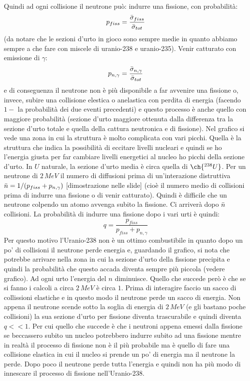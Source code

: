 Quindi ad ogni collisione il neutrone può: indurre una fissione, con probabilità:
\begin{equation*}
    p_{fiss}=\frac{\Bar{\sigma}_{fiss}}{\Bar{\sigma}_{tot}}
\end{equation*}
(da notare che le sezioni d'urto in gioco sono sempre medie in quanto abbiamo sempre a che fare con miscele di uranio-238 e uranio-235). Venir catturato con emissione di $\gamma$:
\begin{equation*}
    p_{n,\gamma}=\frac{\Bar{\sigma}_{n,\gamma}}{\Bar{\sigma}_{tot}}
\end{equation*}
e di conseguenza il neutrone non è più disponibile a far avvenire una fissione o, invece, subire una collisione elestica o anelastica con perdita di energia (facendo $1-$ la probabilità dei due eventi precedenti) e questo processo è anche quello con maggiore probabilità (sezione d'urto maggiore ottenuta dalla differenza tra la sezione d'urto totale e quella della cattura neutronica e di fissione). Nel grafico si vede una zona in cui la struttura è molto complicata con vari picchi. Quella è la struttura che indica la possibilità di eccitare livelli nucleari e quindi se ho l'energia giusta per far cambiare livelli energetici al nucleo ho picchi della sezione d'urto. In $U$ naturale, la sezione d'urto media è circa quella di $\ch{^{238}U}$. Per un neutrone di $2\,MeV$ il numero di diffusioni prima di un'interazione distruttiva $\Bar{n}=1/(p_{fiss}+ p_{n,\gamma})$ [dimostrazione nelle slide] (cioè il numero medio di collisioni prima di indurre una fissione o di venir catturato). Quindi è difficile che un neutrone colpendo un atomo avvenga subito la fissione. Ci arriverà dopo $\Bar{n}$ collisioni. La probabilità di indurre una fissione dopo i vari urti è quindi:
\begin{equation*}
    q=\frac{p_{fiss}}{p_{fiss}+p_{n,\gamma}}
\end{equation*}
Per questo motivo l'Uranio-238 non è un ottimo combustibile in quanto dopo un po' di collisioni il neutrone perde energia e, guardando il grafico, si nota che potrebbe arrivare nella zona in cui la sezione d'urto della fissione precipita e quindi la probabilità che questo accada diventa sempre più piccola (vedere grafico). Ad ogni urto l'energia del $n$ diminuisce. Quello che succede però è che se si fanno i calcoli a circa $2\,MeV$ è circa $1$. Prima di interagire faccio un sacco di collissioni elastiche e in questo modo il neutrone perde un sacco di energia. Non appena il neutrone scende sotto la soglia di energia di $2\,MeV$ (e gli bastano poche collisioni) la sua sezione d'urto per fissione diventa trascurabile e quindi diventa $q<<1$. Per cui quello che succede è che i neutroni appena emessi dalla fissione se beccassero subito un nucleo potrebbero indurre subito ad una fissione mentre in realtà il processo di fissione non è il più probabile ma è quello di fare una collisione elastica in cui il nucleo si prende un po' di energia ma il neutrone la perde. Dopo poco il neutrone perde tutta l'energia e quindi non ha più modo di innescare il processo di fissione nell'Uranio-238.

